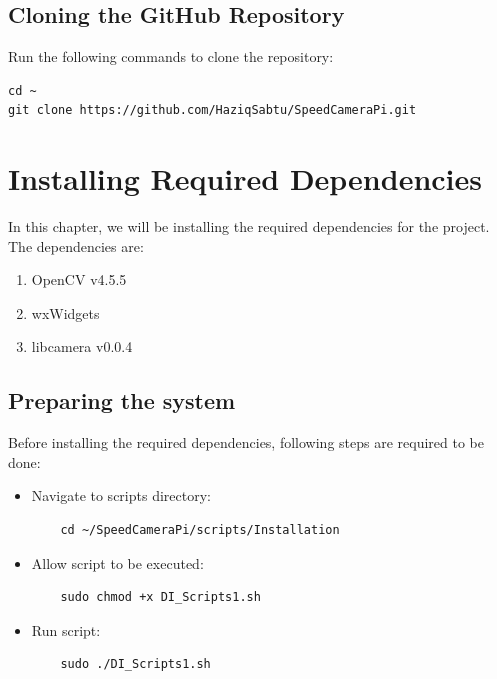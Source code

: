 \section{Cloning the GitHub Repository}
\label{sec:cloning-the-github-repository}

Run the following commands to clone the repository:

\begin{lstlisting}
cd ~
git clone https://github.com/HaziqSabtu/SpeedCameraPi.git
\end{lstlisting}


\chapter{Installing Required Dependencies}
\label{chap:installing-required-dependencies}

In this chapter, we will be installing the required dependencies for the project. The dependencies are:

\begin{enumerate}
      \item OpenCV v4.5.5
      \item wxWidgets
      \item libcamera v0.0.4
\end{enumerate}

\section{Preparing the system}

Before installing the required dependencies, following steps are required to be done:

\begin{itemize}
      \item Navigate to scripts directory:

            \begin{lstlisting}
    cd ~/SpeedCameraPi/scripts/Installation
    \end{lstlisting}

      \item Allow script to be executed:

            \begin{lstlisting}
    sudo chmod +x DI_Scripts1.sh
    \end{lstlisting}

      \item Run script:

            \begin{lstlisting}
    sudo ./DI_Scripts1.sh
    \end{lstlisting}
\end{itemize}

